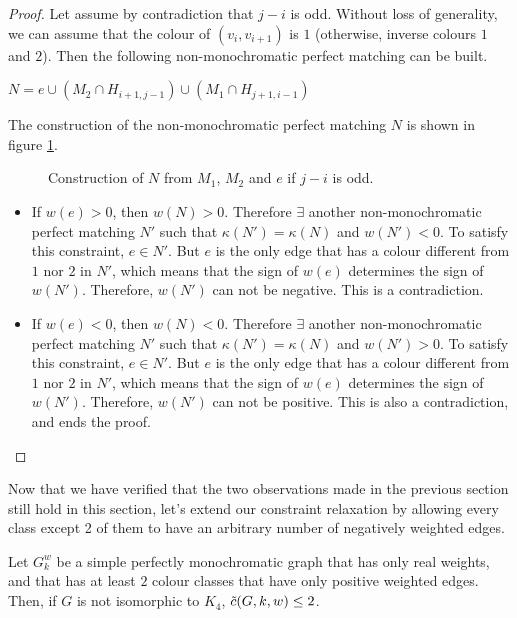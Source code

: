 \begin{proof}
    Let assume by contradiction that $j-i$ is odd.
    Without loss of generality, we can assume that the colour of $(v_i, v_{i+1})$ is $1$ (otherwise, inverse colours $1$ and $2$). Then the following non-monochromatic perfect matching can be built.

    \begin{center}
        $N = e \cup (M_2 \cap H_{i+1, j-1}) \cup (M_1 \cap H_{j+1, i-1})$
    \end{center}

    The construction of the non-monochromatic perfect matching $N$ is shown in figure \ref{fig:2_pos_classes_odd_crossings}.

    \begin{figure}[H]
        \caption{Construction of $N$ from $M_1$, $M_2$ and $e$ if $j-i$ is odd.}
        \label{fig:2_pos_classes_odd_crossings}
    \end{figure}

    \begin{itemize}
        \item If $w(e) > 0$, then $w(N) > 0$. Therefore $\exists$ another non-monochromatic perfect matching $N'$ such that $\kappa(N') = \kappa(N)$ and $w(N') < 0$. To satisfy this constraint, $e \in N'$. But $e$ is the only edge that has a colour different from $1$ nor $2$ in $N'$, which means that the sign of $w(e)$ determines the sign of $w(N')$. Therefore, $w(N')$ can not be negative. This is a contradiction.

        \item If $w(e) < 0$, then $w(N) < 0$. Therefore $\exists$ another non-monochromatic perfect matching $N'$ such that $\kappa(N') = \kappa(N)$ and $w(N') > 0$. To satisfy this constraint, $e \in N'$. But $e$ is the only edge that has a colour different from $1$ nor $2$ in $N'$, which means that the sign of $w(e)$ determines the sign of $w(N')$. Therefore, $w(N')$ can not be positive. This is also a contradiction, and ends the proof.
    \end{itemize}
\end{proof}

Now that we have verified that the two observations made in the previous section still hold in this section, let's extend our constraint relaxation by allowing every class except 2 of them to have an arbitrary number of negatively weighted edges.

\begin{lemma}
    \label{lem:2_positive_colour_classes_forbidden}
    Let $G_k^w$ be a simple perfectly monochromatic graph that has only real weights, and that has at least $2$ colour classes that have only positive weighted edges. Then, if $G$ is not isomorphic to $K_4$, $\Tilde{c}(G, k, w) \leq 2$.
\end{lemma}


